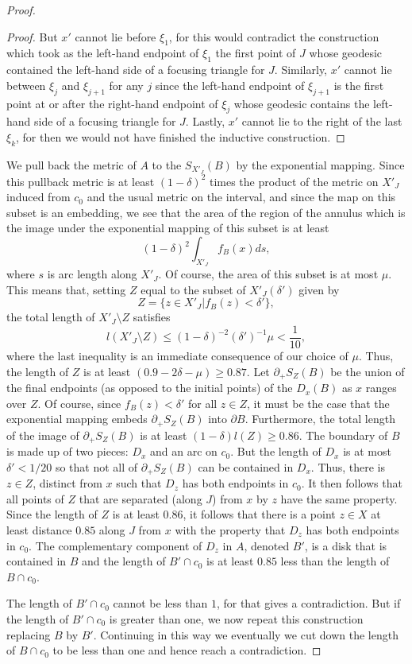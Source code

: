 \begin{proof}
\begin{proof}
But $x'$ cannot lie before $\xi_1$, for this would contradict the
construction which took as the left-hand endpoint of $\xi_1$ the
first point of $J$ whose geodesic contained the left-hand side of a
focusing triangle for $J$. Similarly, $x'$ cannot lie between
$\xi_j$ and $\xi_{j+1}$ for any $j$ since the left-hand endpoint of
$\xi_{j+1}$ is the first point at or after the right-hand endpoint
of $\xi_j$ whose geodesic contains the left-hand side of a focusing
triangle for $J$. Lastly, $x'$ cannot lie to the right of the last
$\xi_k$, for then we would not have finished the inductive
construction.
\end{proof}

We pull back the metric of $A$ to the $S_{X'_J}(B)$ by the
exponential mapping. Since this pullback metric is at least
$(1-\delta)^2$ times the product of the metric on $X'_J$ induced
from $c_0$ and the usual metric on the interval, and since the map
on this subset is an embedding, we see that the area of the region
of the annulus which is the image under the exponential mapping of
this subset is at least
$$(1-\delta)^2\int_{X'_J}f_B(x)ds,$$
where $s$ is arc length along $X'_J$. Of course, the area of this
subset is at most $\mu$. This means that, setting $Z$ equal to the
subset of $ X'_J(\delta')$ given by
$$Z=\{z\in X'_J|f_B(z)<\delta'\},$$ the total length of $X'_J\setminus Z$
satisfies
$$l(X'_J\setminus Z)\le (1-\delta)^{-2}(\delta')^{-1}\mu<\frac{1}{10},$$
where the last inequality is an immediate consequence of our choice
of $\mu$. Thus, the length of $Z$ is at least $(0.9-2\delta-\mu)\ge
0.87$. Let $\partial_+S_Z(B)$ be the union of the final endpoints
(as opposed to the initial points) of the $D_x(B)$ as $x$ ranges
over $Z$.
 Of course, since $f_B(z)<\delta'$
for all $z\in Z$, it must be the case that  the exponential mapping
embeds $\partial_+S_Z(B)$ into $\partial B$. Furthermore, the total
length of the image of $\partial_+S_Z(B)$ is at least
$(1-\delta)l(Z)\ge 0.86$. The boundary of $B$ is made up of two
pieces: $D_x$ and an arc on $c_0$. But the length of $D_x$ is at
most $\delta'<1/20$ so that not all of $\partial_+S_Z(B)$ can be
contained in $D_x$. Thus, there is $z\in Z$, distinct from $x$ such
that $D_z$ has both endpoints in $c_0$. It then follows  that all
points of $Z$ that are separated (along $J$) from $x$ by $z$ have
the same property. Since the length of $Z$ is at least $0.86$, it
follows that there is a point $z\in X$ at least distance $0.85$
along $J$ from $x$ with the property that $D_z$ has both endpoints
in $c_0$. The complementary component of $D_z$ in $A$, denoted $B'$,
 is a disk that is contained in $B$ and the length of $B'\cap c_0$ is at
least $0.85$ less than the length of $B\cap c_0$.

The length of $B'\cap c_0$ cannot be less than $1$, for that gives a
contradiction. But if the length of $B'\cap c_0$ is greater than one, we now
repeat this construction replacing $B$ by $B'$. Continuing in this way we
eventually we cut down the length of $B\cap c_0$ to be less than one and hence
reach a contradiction.
\end{proof}


